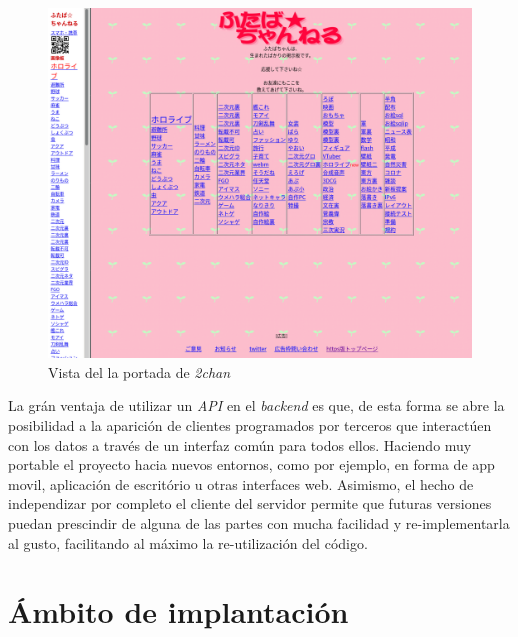 \documentclass[12pt,a4paper,titlepage]{article}
\begin{document}
    \begin{figure}[ht]
        \centering
        \caption{Vista del la portada de \textit{2chan}}\bigskip
        \label{2chan:home}
        \includegraphics[width=1.0\textwidth]{media/2chan-home.png}
    \end{figure}

    La grán ventaja de utilizar un \emph{API} en el \textit{backend} es que, de esta forma se abre la posibilidad a la aparición de clientes programados por terceros que interactúen con los datos a través de un interfaz común para todos ellos. Haciendo muy portable el proyecto hacia nuevos entornos, como por ejemplo, en forma de app movil, aplicación de escritório u otras interfaces web. Asimismo, el hecho de independizar por completo el cliente del servidor permite que futuras versiones puedan prescindir de alguna de las partes con mucha facilidad y re-implementarla al gusto, facilitando al máximo la re-utilización del código.

    \section{Ámbito de implantación}


\end{document}
